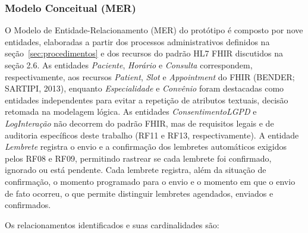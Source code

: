 \documentclass[12pt,a4paper]{extarticle}
\begin{document}
\subsubsection{Modelo Conceitual (MER)}

O Modelo de Entidade-Relacionamento (MER) do protótipo é composto por nove entidades, elaboradas a partir dos processos administrativos definidos na seção~\ref{sec:procedimentos} e dos recursos do padrão HL7 FHIR discutidos na seção 2.6. As entidades \textit{Paciente}, \textit{Horário} e \textit{Consulta} correspondem, respectivamente, aos recursos \textit{Patient}, \textit{Slot} e \textit{Appointment} do FHIR (BENDER; SARTIPI, 2013), enquanto \textit{Especialidade} e \textit{Convênio} foram destacadas como entidades independentes para evitar a repetição de atributos textuais, decisão retomada na modelagem lógica. As entidades \textit{ConsentimentoLGPD} e \textit{LogInteração} não decorrem do padrão FHIR, mas de requisitos legais e de auditoria específicos deste trabalho (RF11 e RF13, respectivamente). A entidade \textit{Lembrete} registra o envio e a confirmação dos lembretes automáticos exigidos pelos RF08 e RF09, permitindo rastrear se cada lembrete foi confirmado, ignorado ou está pendente. Cada lembrete registra, além da situação de confirmação, o momento programado para o envio e o momento em que o envio de fato ocorreu, o que permite distinguir lembretes agendados, enviados e confirmados.

Os relacionamentos identificados e suas cardinalidades são:
\end{document}
